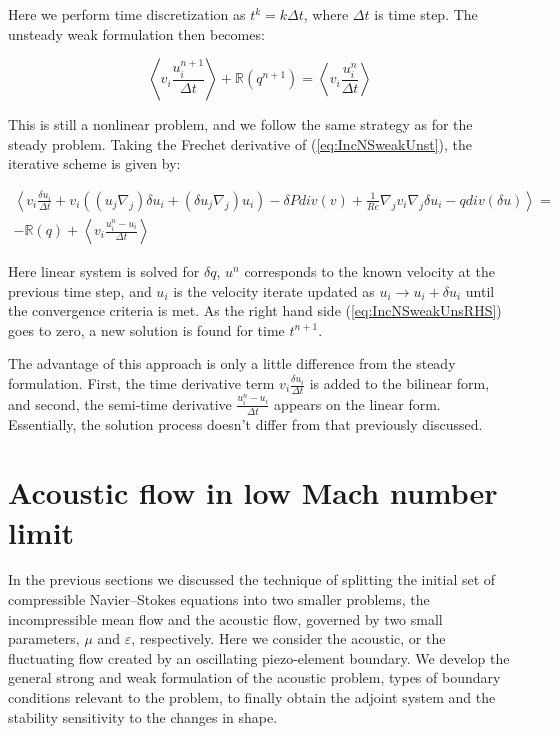 Here we perform time discretization as $t^k = k\Delta t$, where $\Delta t$ is time step. The unsteady weak formulation then becomes:

\begin{equation}
\label{eq:IncNSweakUnst}
    \left< v_i \frac{u^{n+1}_i}{\Delta t} \right> + \mathbb{R}(q^{n+1}) = \left< v_i \frac{u^{n}_i}{\Delta t} \right>
\end{equation}

This is still a nonlinear problem, and we follow the same strategy as for the steady problem. Taking the Frechet derivative of (\ref{eq:IncNSweakUnst}), the iterative scheme is given by:

\begin{subequations}
\begin{align}
    \left< v_i \frac{\delta u_i}{\Delta t}  + v_i \left( (u_j \nabla_j) \delta u_i + (\delta  u_j \nabla_j) u_i \right) - \delta  P div(v) + \frac{1}{Re}\nabla_j v_i \nabla_j \delta  u_i - q div(\delta u)\right> = \\
    \label{eq:IncNSweakUnsRHS}
    - \mathbb{R}(q) + \left< v_i \frac{u^{n}_i - u_i}{\Delta t} \right>
\end{align}
\end{subequations}

Here linear system is solved for $\delta q$, $u^n$ corresponds to the known velocity at the previous time step, and $u_i$ is the velocity iterate updated as $u_i \rightarrow u_i + \delta u_i$ until the convergence criteria is met. As the right hand side (\ref{eq:IncNSweakUnsRHS}) goes to zero, a new solution is found for time $t^{n+1}$.

The advantage of this approach is only a little difference from the steady formulation. First, the time derivative term $v_i \frac{\delta u_i}{\Delta t}$ is added to the bilinear form, and second, the semi-time derivative $\frac{u^{n}_i - u_i}{\Delta t}$ appears on the linear form. Essentially, the solution process doesn't differ from that previously discussed. 
\clearpage





\section{Acoustic flow in low Mach number limit}

In the previous sections we discussed the technique of splitting the initial set of compressible Navier--Stokes equations into two smaller problems, the incompressible mean flow and the acoustic flow, governed by two small parameters, $\mu$ and $\varepsilon$, respectively. Here we consider the acoustic, or the fluctuating flow created by an oscillating piezo-element boundary. We develop the general strong and weak formulation of the acoustic problem, types of boundary conditions relevant to the problem, to finally obtain the adjoint system and the stability sensitivity to the changes in shape.

